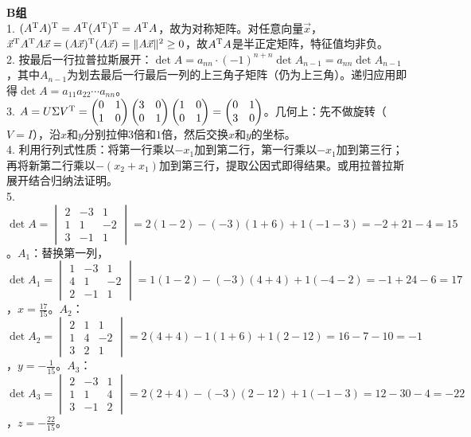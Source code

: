 \noindent\textbf{B组}\\
1. $(A^{\text T}A)^{\text T}=A^{\text T}(A^{\text T})^{\text T}=A^{\text T}A$，故为对称矩阵。对任意向量$\vec x$，$\vec x^{\text T}A^{\text T}A\vec x = (A\vec x)^{\text T}(A\vec x) = \|A\vec x\|^2 \geq 0$，故$A^{\text T}A$是半正定矩阵，特征值均非负。\\
2. 按最后一行拉普拉斯展开：$\det A = a_{nn}\cdot(-1)^{n+n}\det A_{n-1}=a_{nn}\det A_{n-1}$，其中$A_{n-1}$为划去最后一行最后一列的上三角子矩阵（仍为上三角）。递归应用即得$\det A = a_{11}a_{22}\cdots a_{nn}$。\\
3. $A=U\Sigma V^{\text T}=\begin{pmatrix}0&1\\1&0\end{pmatrix}\begin{pmatrix}3&0\\0&1\end{pmatrix}\begin{pmatrix}1&0\\0&1\end{pmatrix}=\begin{pmatrix}0&1\\3&0\end{pmatrix}$。几何上：先不做旋转（$V=I$），沿$x$和$y$分别拉伸$3$倍和$1$倍，然后交换$x$和$y$的坐标。\\
4. 利用行列式性质：将第一行乘以$-x_1$加到第二行，第一行乘以$-x_1$加到第三行；再将新第二行乘以$-(x_2+x_1)$加到第三行，提取公因式即得结果。或用拉普拉斯展开结合归纳法证明。\\
5. $\det A=\begin{vmatrix}2&-3&1\\1&1&-2\\3&-1&1\end{vmatrix}=2(1-2)-(-3)(1+6)+1(-1-3)=-2+21-4=15$。$A_1$：替换第一列，$\det A_1=\begin{vmatrix}1&-3&1\\4&1&-2\\2&-1&1\end{vmatrix}=1(1-2)-(-3)(4+4)+1(-4-2)=-1+24-6=17$，$x=\frac{17}{15}$。$A_2$：$\det A_2=\begin{vmatrix}2&1&1\\1&4&-2\\3&2&1\end{vmatrix}=2(4+4)-1(1+6)+1(2-12)=16-7-10=-1$，$y=-\frac1{15}$。$A_3$：$\det A_3=\begin{vmatrix}2&-3&1\\1&1&4\\3&-1&2\end{vmatrix}=2(2+4)-(-3)(2-12)+1(-1-3)=12-30-4=-22$，$z=-\frac{22}{15}$。\\
